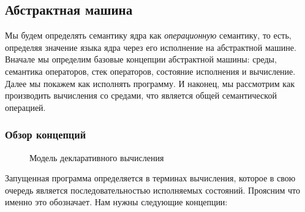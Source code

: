 \subsection{Абстрактная машина}

Мы будем определять семантику ядра как \emph{операционную} семантику, то есть, определяя значение языка ядра через его исполнение на абстрактной машине. Вначале мы определим базовые концепции абстрактной машины: среды, семантика операторов, стек операторов, состояние исполнения и вычисление. Далее мы покажем как исполнять программу. И наконец, мы рассмотрим как производить вычисления со средами, что является общей семантической операцией.

\subsubsection{Обзор концепций}

\begin{figure}
\caption{Модель декларативного вычисления}
\label{figure:the_declarative_computation_model}
\end{figure}

Запущенная программа определяется в терминах вычисления, которое в свою очередь является последовательностью исполняемых состояний. Проясним что именно это обозначает. Нам нужны следующие концепции:

